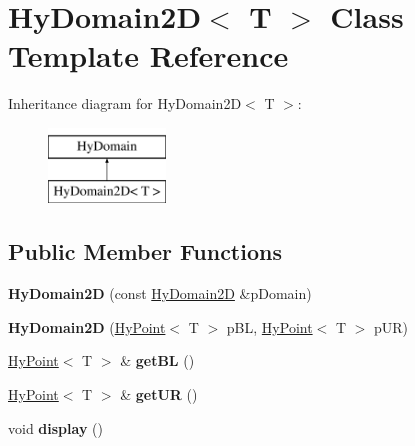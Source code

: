 \hypertarget{classHyDomain2D}{
\section{HyDomain2D$<$ T $>$ Class Template Reference}
\label{classHyDomain2D}
}
Inheritance diagram for HyDomain2D$<$ T $>$:\begin{figure}[H]
\begin{center}
\leavevmode
\includegraphics[height=2cm]{classHyDomain2D}
\end{center}
\end{figure}
\subsection*{Public Member Functions}
\begin{DoxyCompactItemize}
\item 
\hypertarget{classHyDomain2D_a2b65b9b7ae2c54d840518351ca7e4a42}{
{\bfseries HyDomain2D} (const \hyperlink{classHyDomain2D}{HyDomain2D} \&pDomain)}
\label{classHyDomain2D_a2b65b9b7ae2c54d840518351ca7e4a42}

\item 
\hypertarget{classHyDomain2D_a079ecbfa620eca38ec1bfae5d1bb4d87}{
{\bfseries HyDomain2D} (\hyperlink{classHyPoint}{HyPoint}$<$ T $>$ pBL, \hyperlink{classHyPoint}{HyPoint}$<$ T $>$ pUR)}
\label{classHyDomain2D_a079ecbfa620eca38ec1bfae5d1bb4d87}

\item 
\hypertarget{classHyDomain2D_a12253bfa27200739ab21b47fd761a411}{
\hyperlink{classHyPoint}{HyPoint}$<$ T $>$ \& {\bfseries getBL} ()}
\label{classHyDomain2D_a12253bfa27200739ab21b47fd761a411}

\item 
\hypertarget{classHyDomain2D_a9ddb9dae80c7ac3f8e8006e311560288}{
\hyperlink{classHyPoint}{HyPoint}$<$ T $>$ \& {\bfseries getUR} ()}
\label{classHyDomain2D_a9ddb9dae80c7ac3f8e8006e311560288}

\item 
\hypertarget{classHyDomain2D_ad94a903b3a92ca6582f7943fe2063d5b}{
void {\bfseries display} ()}
\label{classHyDomain2D_ad94a903b3a92ca6582f7943fe2063d5b}

\end{DoxyCompactItemize}
